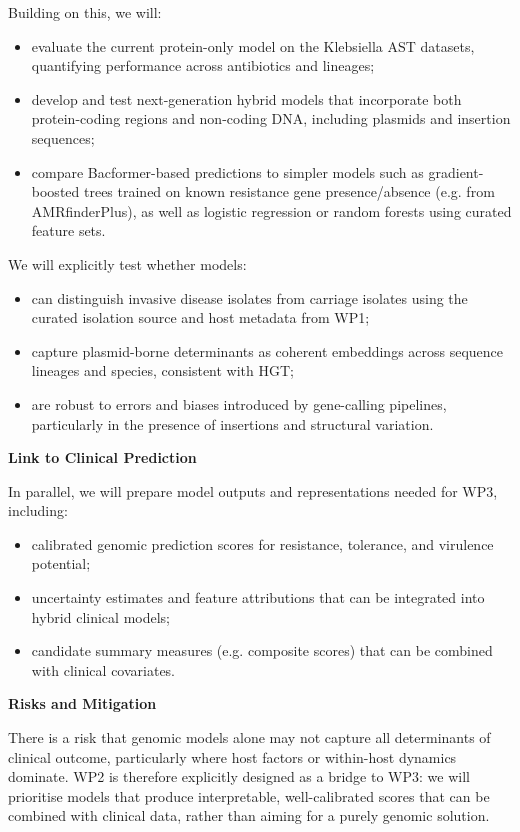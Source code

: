 Building on this, we will:

\begin{itemize}
  \item evaluate the current protein-only model on the Klebsiella AST datasets, 
  quantifying performance across antibiotics and lineages;
  \item develop and test next-generation hybrid models that incorporate 
  both protein-coding regions and non-coding DNA, including plasmids and insertion sequences;
  \item compare Bacformer-based predictions to simpler models such as 
  gradient-boosted trees trained on known resistance gene presence/absence (e.g. from AMRfinderPlus), 
  as well as logistic regression or random forests using curated feature sets.
\end{itemize}

We will explicitly test whether models:

\begin{itemize}
  \item can distinguish invasive disease isolates from carriage isolates using the curated isolation source and host metadata from WP1;
  \item capture plasmid-borne determinants as coherent embeddings across sequence lineages and species, consistent with HGT;
  \item are robust to errors and biases introduced by gene-calling pipelines, 
  particularly in the presence of insertions and structural variation.
\end{itemize}

\textbf{Link to Clinical Prediction}

In parallel, we will prepare model outputs and representations needed for WP3, including:

\begin{itemize}
  \item calibrated genomic prediction scores for resistance, tolerance, and virulence potential;
  \item uncertainty estimates and feature attributions that can be integrated into hybrid clinical models;
  \item candidate summary measures (e.g. composite scores) that can be combined with clinical covariates.
\end{itemize}

\textbf{Risks and Mitigation}

There is a risk that genomic models alone may not capture all determinants of clinical outcome, 
particularly where host factors or within-host dynamics dominate. WP2 is therefore explicitly 
designed as a bridge to WP3: we will prioritise models that produce interpretable, well-calibrated scores 
that can be combined with clinical data, rather than aiming for a purely genomic solution.

